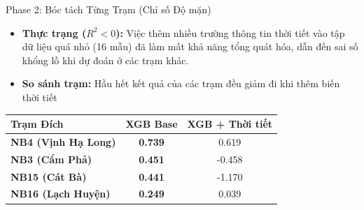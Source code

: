 \begin{frame}{Phase 2: Bóc tách Từng Trạm (Chỉ số Độ mặn)}
  \begin{itemize}
    \item \textbf{Thực trạng ($R^2 < 0$):} Việc thêm nhiều trường thông tin thời tiết vào tập dữ liệu quá nhỏ (16 mẫu) đã làm mất khả năng tổng quát hóa, dẫn đến sai số khổng lồ khi dự đoán ở các trạm khác.
    \item \textbf{So sánh trạm:} Hầu hết kết quả của các trạm đều giảm đi khi thêm biến thời tiết
  \end{itemize}

  \vspace{0.3cm}
  \begin{table}[]
    \centering
    \small
    \begin{tabular}{lcc}
        \toprule
        \textbf{Trạm Đích} & \textbf{XGB Base} & \textbf{XGB + Thời tiết} \\ \midrule
        \rowcolor{green!10}
        \textbf{NB4 (Vịnh Hạ Long)} & \textbf{0.739} & 0.619 \\
        \textbf{NB3 (Cẩm Phả)} & \textbf{0.451} & -0.458 \\
        \textbf{NB15 (Cát Bà)} & \textbf{0.441} & -1.170 \\
        \textbf{NB16 (Lạch Huyện)} & \textbf{0.249} & 0.039 \\ \bottomrule
    \end{tabular}
  \end{table}
\end{frame}

